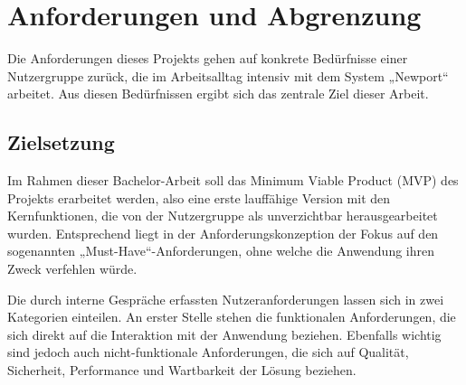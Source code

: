 \section{Anforderungen und Abgrenzung}
Die Anforderungen dieses Projekts gehen auf konkrete Bedürfnisse einer Nutzergruppe zurück, 
die im Arbeitsalltag intensiv mit dem System „Newport“ arbeitet. Aus diesen Bedürfnissen ergibt sich das zentrale Ziel dieser Arbeit.

\subsection{Zielsetzung}
Im Rahmen dieser Bachelor-Arbeit soll das Minimum Viable Product (MVP) des Projekts erarbeitet werden, also 
eine erste lauffähige Version mit den Kernfunktionen, die von der Nutzergruppe als unverzichtbar herausgearbeitet 
wurden. Entsprechend liegt in der Anforderungskonzeption der Fokus auf den sogenannten „Must-Have“-Anforderungen,
ohne welche die Anwendung ihren Zweck verfehlen würde. 

Die durch interne Gespräche erfassten Nutzeranforderungen lassen sich in zwei Kategorien einteilen. An erster Stelle stehen
die funktionalen Anforderungen, die sich direkt auf die Interaktion mit der Anwendung beziehen. Ebenfalls wichtig sind jedoch auch
nicht-funktionale Anforderungen, die sich auf Qualität, Sicherheit, Performance und Wartbarkeit der Lösung beziehen.

